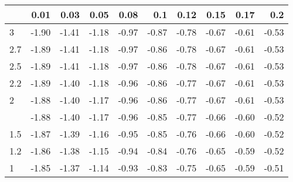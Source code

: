 
\begin{tabular}{lrrrrrrrrr}
\toprule
  & 0.01 & 0.03 & 0.05 & 0.08 & 0.1 & 0.12 & 0.15 & 0.17 & 0.2\\
\midrule
3 & -1.90 & -1.41 & -1.18 & -0.97 & -0.87 & -0.78 & -0.67 & -0.61 & -0.53\\
2.7 & -1.89 & -1.41 & -1.18 & -0.97 & -0.86 & -0.78 & -0.67 & -0.61 & -0.53\\
2.5 & -1.89 & -1.41 & -1.18 & -0.97 & -0.86 & -0.78 & -0.67 & -0.61 & -0.53\\
2.2 & -1.89 & -1.40 & -1.18 & -0.96 & -0.86 & -0.77 & -0.67 & -0.61 & -0.53\\
2 & -1.88 & -1.40 & -1.17 & -0.96 & -0.86 & -0.77 & -0.67 & -0.61 & -0.53\\
\addlinespace
1.7 & -1.88 & -1.40 & -1.17 & -0.96 & -0.85 & -0.77 & -0.66 & -0.60 & -0.52\\
1.5 & -1.87 & -1.39 & -1.16 & -0.95 & -0.85 & -0.76 & -0.66 & -0.60 & -0.52\\
1.2 & -1.86 & -1.38 & -1.15 & -0.94 & -0.84 & -0.76 & -0.65 & -0.59 & -0.52\\
1 & -1.85 & -1.37 & -1.14 & -0.93 & -0.83 & -0.75 & -0.65 & -0.59 & -0.51\\
\bottomrule
\end{tabular}
